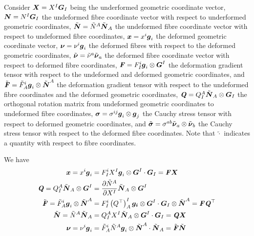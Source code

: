 Consider $ \boldsymbol{X} =X^{I} \boldsymbol{G} _{I}$ being the underformed geometric
coordinate vector, $ \boldsymbol{N} =N^{I} \boldsymbol{G} _{I}$ the undeformed fibre
coordinate vector with respect to underformed geometric coordinates,
$\tilde{ \boldsymbol{N} }=\tilde{N}^{A}\tilde{ \boldsymbol{N} }_{A}$ the undeformed fibre
coordinate vector with respect to undeformed fibre coordinates,
$ \boldsymbol{x} =x^{i} \boldsymbol{g} _{i}$ the deformed geometric coordinate vector,
$ \boldsymbol{\nu} =\nu^{i} \boldsymbol{g} _{i}$ the deformed fibres with respect to the
deformed geometric coordinates,
$\tilde{ \boldsymbol{\nu} }=\tilde{\nu}^{a}\tilde{ \boldsymbol{\nu} }_{a}$ the deformed
fibre coordinate vector with respect to deformed fibre coordinates,
$\boldsymbol{\mathit{F}}=F^{i}_{I}  \boldsymbol{g} _{i} \otimes  \boldsymbol{G} ^{I} $ the
deformation gradient tensor with respect to the undeformed and deformed
geometric coordinates, and
$\tilde{\boldsymbol{\mathit{F}}}=\tilde{F}^{i}_{A}  \boldsymbol{g} _{i} \otimes \tilde{ \boldsymbol{N} }^{A} $
the deformation gradient tensor with respect to the undeformed fibre
coordinates and the deformed geometric coordinates,
$\boldsymbol{\mathit{Q}}=Q^{A}_{I} \tilde{ \boldsymbol{N} }_{A} \otimes  \boldsymbol{G} _{I} $ the
orthogonal rotation matrix from undeformed geometric coordinates to undeformed
fibre coordinates,
$\boldsymbol{\mathit{\sigma}}=\sigma^{ij}  \boldsymbol{g} _{i} \otimes  \boldsymbol{g} _{j} $ the
Cauchy stress tensor with respect to deformed geometric coordinates, and
$\tilde{\boldsymbol{\mathit{\sigma}}}=\sigma^{ab} \tilde{ \boldsymbol{\nu} }_{a} \otimes \tilde{ \boldsymbol{\nu} }_{b} $
the Cauchy stress tensor with respect to the deformed fibre coordinates. Note
that $\tilde{\cdot}$ indicates a quantity with respect to fibre coordinates.

We have
\begin{align}
   \boldsymbol{x} =x^{i} \boldsymbol{g} _{i}&=F^{i}_{I}X^{I}   \boldsymbol{g} _{i} \otimes  \boldsymbol{G} ^{I}   \cdot   \boldsymbol{G} _{I} =\boldsymbol{\mathit{F}} \boldsymbol{X} \\
  \boldsymbol{\mathit{Q}}=Q^{A}_{I} \tilde{ \boldsymbol{N} }_{A} \otimes  \boldsymbol{G} ^{I} &= \dfrac{\partial \tilde{N}^{A}}{\partial X^{I}}  \tilde{ \boldsymbol{N} }_{A} \otimes  \boldsymbol{G} ^{I} \\
  \tilde{\boldsymbol{\mathit{F}}}=\tilde{F}^{i}_{A}  \boldsymbol{g} _{i} \otimes \tilde{ \boldsymbol{N} }^{A} &=F^{i}_{I}\left(  {Q}^{ \top }  \right)^{I}_{A}   \boldsymbol{g_{i}}  \otimes  \boldsymbol{G} ^{I}   \cdot    \boldsymbol{G} _{I} \otimes \tilde{ \boldsymbol{N} }^{A}  =\boldsymbol{\mathit{F}} {\boldsymbol{\mathit{Q}}}^{ \top } \\
  \tilde{ \boldsymbol{N} }=\tilde{N}^{A}\tilde{ \boldsymbol{N} }_{A}&=Q^{A}_{I}X^{I}  \tilde{ \boldsymbol{N} }_{A} \otimes  \boldsymbol{G} ^{I}   \cdot   \boldsymbol{G} _{I} =\boldsymbol{\mathit{Q}} \boldsymbol{X}  \\
   \boldsymbol{\nu} =\nu^{i} \boldsymbol{g} _{i}&=\tilde{F}^{i}_{A}\tilde{N}^{A}   \boldsymbol{g} _{i} \otimes \tilde{ \boldsymbol{N} }^{A}   \cdot  \tilde{ \boldsymbol{N} }_{A} =\tilde{\boldsymbol{\mathit{F}}}\tilde{ \boldsymbol{N} }
\end{align}


